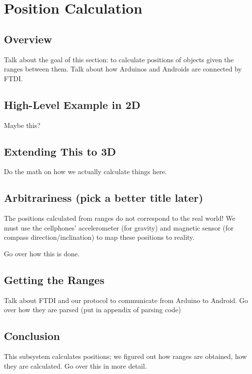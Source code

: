 
\chapter{Position Calculation} %

\label{PositionCalculation}


\section{Overview}
Talk about the goal of this section: to calculate positions of objects given the ranges between them. Talk about how Arduinos and Androids are connected by FTDI.

\section{High-Level Example in 2D}
Maybe this?

\section{Extending This to 3D}
Do the math on how we actually calculate things here.

\section{Arbitrariness (pick a better title later)}
The positions calculated from ranges do not correspond to the real world! We must use the cellphones' accelerometer (for gravity) and magnetic sensor (for compass direction/inclination) to map these positions to reality.

Go over how this is done.

\section{Getting the Ranges}
Talk about FTDI and our protocol to communicate from Arduino to Android. Go over how they are parsed (put in appendix of parsing code)

\section{Conclusion}
This subsystem calculates positions; we figured out how ranges are obtained, how they are calculated. Go over this in more detail.

